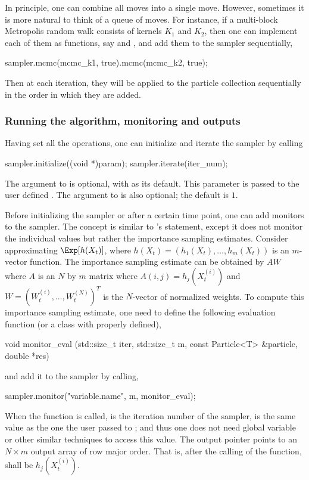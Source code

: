 In principle, one can combine all moves into a single move. However, sometimes
it is more natural to think of a queue of moves. For instance, if a
multi-block Metropolis random walk consists of kernels $K_1$ and $K_2$, then
one can implement each of them as functions, say  and
, and add them to the sampler sequentially,
\begin{cppcode}
sampler.mcmc(mcmc_k1, true).mcmc(mcmc_k2, true);
\end{cppcode}
Then at each iteration, they will be applied to the particle collection
sequentially in the order in which they are added.

\subsubsection{Running the algorithm, monitoring and outputs}
\label{ssub:Running the algorithm, monitoring and outputs}

Having set all the operations, one can initialize and iterate the sampler by
calling
\begin{cppcode}
sampler.initialize((void *)param);
sampler.iterate(iter_num);
\end{cppcode}
The  argument to  is optional, with 
as its default. This parameter is passed to the user defined .
The  argument to  is also optional; the default
is $1$.

Before initializing the sampler or after a certain time point, one can add
monitors to the sampler. The concept is similar to \bugs's 
statement, except it does not monitor the individual values but rather the
importance sampling estimates. Consider approximating $\Exp[h(X_t)]$, where
$h(X_t) = (h_1(X_t),\dots,h_m(X_t))$ is an $m$-vector function. The importance
sampling estimate can be obtained by $AW$ where $A$ is an $N$ by $m$ matrix
where $A(i,j) = h_j(X_t^{(i)})$ and $W = (W_t^{(i)},\dots,W_t^{(N)})^T$ is the
$N$-vector of normalized weights. To compute this importance sampling
estimate, one need to define the following evaluation function (or a class
with  properly defined),
\begin{cppcode}
void monitor_eval (std::size_t iter, std::size_t m,
        const Particle<T> &particle, double *res)
\end{cppcode}
and add it to the sampler by calling,
\begin{cppcode}
sampler.monitor("variable.name", m, monitor_eval);
\end{cppcode}
When the function  is called,  is the iteration
number of the sampler,  is the same value as the one the user passed
to ; and thus one does not need global variable or
other similar techniques to access this value. The output pointer 
points to an $N \times m$ output array of row major order. That is, after the
calling of the function,  shall be $h_j(X_t^{(i)})$.

